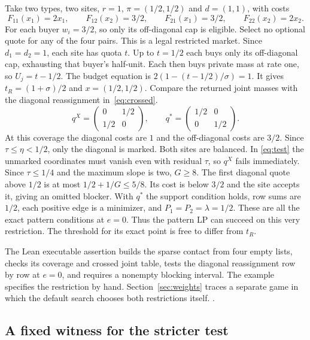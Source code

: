 \documentclass[11pt,letterpaper]{article}
\newcommand{\code}[1]{\textnormal{\texttt{\detokenize{#1}}}}
\newcommand{\baseurl}{https://github.com/robbiemu/bayesian-simple-security-games/blob/75bc25c2ddfac1813064434a3165b3ddd1a1f63d}
\newcommand{\decl}[3]{\href{\baseurl/lean/#1.lean\#L#2}{\code{#3}}}
\begin{document}
Take two types, two sites, $r=1$, $\pi=(1/2,1/2)$ and $d=(1,1)$, with costs
\[
  F_{11}(x_1)=2x_1,\qquad F_{12}(x_2)=3/2,\qquad
  F_{21}(x_1)=3/2,\qquad F_{22}(x_2)=2x_2 .
\]
For each buyer $w_i=3/2$, so only its off-diagonal cap is eligible.
Select no optional quote for any of the four pairs. This is a legal
restricted market. Since $d_1=d_2=1$, each site has quota $t$. Up to
$t=1/2$ each buys only its off-diagonal cap, exhausting that buyer's
half-unit. Each then buys private mass at rate one, so $U_j=t-1/2$.
The budget equation is $2(1-(t-1/2)/\sigma)=1$. It gives
$t_R=(1+\sigma)/2$ and $x=(1/2,1/2)$. Compare
the returned joint masses with the diagonal reassignment in~\eqref{eq:crossed}.
\begin{equation}
    q^X=\begin{pmatrix}0&1/2\\1/2&0\end{pmatrix},\qquad
    q^\ast=\begin{pmatrix}1/2&0\\0&1/2\end{pmatrix}.
    \label{eq:crossed}
\end{equation}
At this coverage the diagonal costs are $1$ and the off-diagonal costs are
$3/2$. Since $\tau\le\eta<1/2$, only the diagonal is marked. Both sites
are balanced. In \eqref{eq:test} the unmarked coordinates must vanish
even with residual $\tau$, so $q^X$ fails immediately. Since
$\tau\le1/4$ and the maximum slope is two, $G\ge8$. The first diagonal
quote above $1/2$ is at most $1/2+1/G\le5/8$. Its cost is below
$3/2$ and the site accepts it, giving an omitted blocker. With $q^\ast$
the support condition holds, row sums are $1/2$, each positive edge is a
minimizer, and $P_1=P_2=\lambda=1/2$. These are all the exact pattern
conditions at $e=0$. Thus the pattern LP can succeed on this very
restriction. The threshold for its exact point is free to differ from $t_R$.

The Lean executable assertion builds the sparse contact from four empty lists,
checks its coverage and crossed joint table, tests the diagonal reassignment
row by row at $e=0$, and requires a nonempty blocking interval. The example
specifies the restriction by hand. Section~\ref{sec:weights} traces a
separate game in which the default search chooses both restrictions itself.
\cite{followup,pythonrecord} \decl{Replay/KintaliSearch}{36}{checksCrossedTrial}.

\subsection{A fixed witness for the stricter test}
\end{document}
